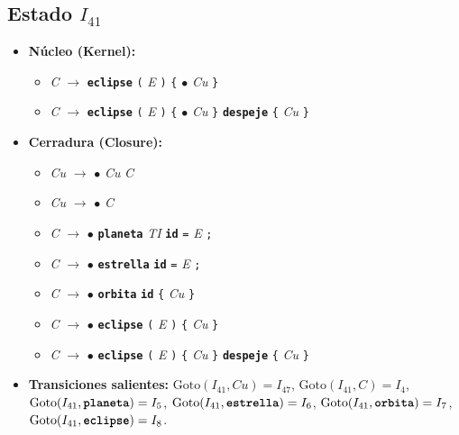 \documentclass[12pt, letterpaper]{article}
\begin{document}
\subsection*{Estado $I_{41}$ }
\begin{itemize}\setlength{\itemsep}{1pt}\setlength{\parskip}{0pt}
\item \textbf{Núcleo (Kernel):}
\begin{itemize}\setlength{\itemsep}{1pt}\setlength{\parskip}{0pt}
    \item \textit{C} $\to$ \textbf{\texttt{eclipse}} \texttt{(} \textit{E} \texttt{)} \texttt{\{} $\bullet$ \textit{Cu} \texttt{\}}
    \item \textit{C} $\to$ \textbf{\texttt{eclipse}} \texttt{(} \textit{E} \texttt{)} \texttt{\{} $\bullet$ \textit{Cu} \texttt{\}} \textbf{\texttt{despeje}} \texttt{\{} \textit{Cu} \texttt{\}}
\end{itemize}
\item \textbf{Cerradura (Closure):}
\begin{itemize}\setlength{\itemsep}{1pt}\setlength{\parskip}{0pt}
    \item \textit{Cu} $\to$ $\bullet$ \textit{Cu} \textit{C}
    \item \textit{Cu} $\to$ $\bullet$ \textit{C}
    \item \textit{C} $\to$ $\bullet$ \textbf{\texttt{planeta}} \textit{TI} \textbf{\texttt{id}} \texttt{=} \textit{E} \texttt{;}
    \item \textit{C} $\to$ $\bullet$ \textbf{\texttt{estrella}} \textbf{\texttt{id}} \texttt{=} \textit{E} \texttt{;}
    \item \textit{C} $\to$ $\bullet$ \textbf{\texttt{orbita}} \textbf{\texttt{id}} \texttt{\{} \textit{Cu} \texttt{\}}
    \item \textit{C} $\to$ $\bullet$ \textbf{\texttt{eclipse}} \texttt{(} \textit{E} \texttt{)} \texttt{\{} \textit{Cu} \texttt{\}}
    \item \textit{C} $\to$ $\bullet$ \textbf{\texttt{eclipse}} \texttt{(} \textit{E} \texttt{)} \texttt{\{} \textit{Cu} \texttt{\}} \textbf{\texttt{despeje}} \texttt{\{} \textit{Cu} \texttt{\}}
\end{itemize}
\item \textbf{Transiciones salientes:} $\text{Goto}(I_{41}, \textit{Cu}) = I_{47}$, \quad $\text{Goto}(I_{41}, \textit{C}) = I_{4}$, \quad $\text{Goto}(I_{41}, \textbf{\texttt{planeta}}) = I_{5}$, \quad $\text{Goto}(I_{41}, \textbf{\texttt{estrella}}) = I_{6}$, \quad $\text{Goto}(I_{41}, \textbf{\texttt{orbita}}) = I_{7}$, \quad $\text{Goto}(I_{41}, \textbf{\texttt{eclipse}}) = I_{8}$.
\end{itemize}
\vspace{2pt}
\end{document}
